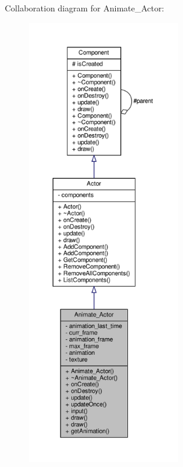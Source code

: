 Collaboration diagram for Animate\+\_\+\+Actor\+:
\nopagebreak
\begin{figure}[H]
\begin{center}
\leavevmode
\includegraphics[height=550pt]{classAnimate__Actor__coll__graph}
\end{center}
\end{figure}
